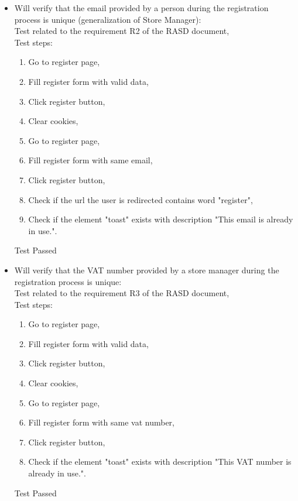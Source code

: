 \begin{itemize}
    \item Will verify that the email provided by a person during the registration process is unique (generalization of Store Manager): \\
    Test related to the requirement R2 of the RASD document, \\
    Test steps:
    \begin{enumerate}
        \item Go to register page,
        \item Fill register form with valid data,
        \item Click register button,
        \item Clear cookies,
        \item Go to register page,
        \item Fill register form with same email,
        \item Click register button,
        \item Check if the url the user is redirected contains word "register",
        \item Check if the element "toast" exists with description "This email is already in use.".
    \end{enumerate}
    Test Passed \\

    \item Will verify that the VAT number provided by a store manager during the registration process is unique: \\
    Test related to the requirement R3 of the RASD document, \\
    Test steps:
    \begin{enumerate}
        \item Go to register page,
        \item Fill register form with valid data,
        \item Click register button,
        \item Clear cookies,
        \item Go to register page,
        \item Fill register form with same vat number,
        \item Click register button,
        \item Check if the element "toast" exists with description "This VAT number is already in use.".
    \end{enumerate}
    Test Passed \\


\end{itemize}
